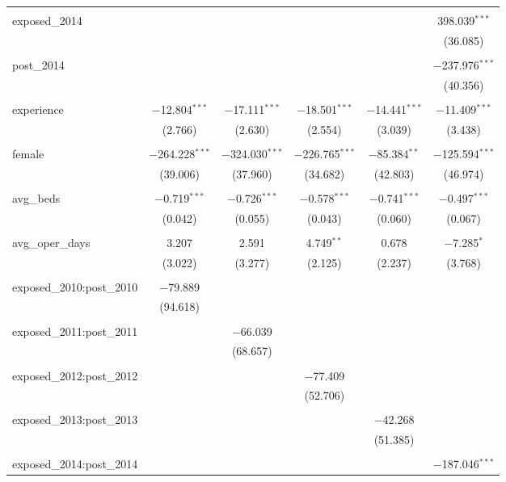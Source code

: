\begin{table}[!htbp]
\begin{tabular}{@{\extracolsep{5pt}}lccccc}
  & & & & & \\ 
 exposed\_2014 &  &  &  &  & 398.039$^{***}$ \\ 
  &  &  &  &  & (36.085) \\ 
  & & & & & \\ 
 post\_2014 &  &  &  &  & $-$237.976$^{***}$ \\ 
  &  &  &  &  & (40.356) \\ 
  & & & & & \\ 
 experience & $-$12.804$^{***}$ & $-$17.111$^{***}$ & $-$18.501$^{***}$ & $-$14.441$^{***}$ & $-$11.409$^{***}$ \\ 
  & (2.766) & (2.630) & (2.554) & (3.039) & (3.438) \\ 
  & & & & & \\ 
 female & $-$264.228$^{***}$ & $-$324.030$^{***}$ & $-$226.765$^{***}$ & $-$85.384$^{**}$ & $-$125.594$^{***}$ \\ 
  & (39.006) & (37.960) & (34.682) & (42.803) & (46.974) \\ 
  & & & & & \\ 
 avg\_beds & $-$0.719$^{***}$ & $-$0.726$^{***}$ & $-$0.578$^{***}$ & $-$0.741$^{***}$ & $-$0.497$^{***}$ \\ 
  & (0.042) & (0.055) & (0.043) & (0.060) & (0.067) \\ 
  & & & & & \\ 
 avg\_oper\_days & 3.207 & 2.591 & 4.749$^{**}$ & 0.678 & $-$7.285$^{*}$ \\ 
  & (3.022) & (3.277) & (2.125) & (2.237) & (3.768) \\ 
  & & & & & \\ 
 exposed\_2010:post\_2010 & $-$79.889 &  &  &  &  \\ 
  & (94.618) &  &  &  &  \\ 
  & & & & & \\ 
 exposed\_2011:post\_2011 &  & $-$66.039 &  &  &  \\ 
  &  & (68.657) &  &  &  \\ 
  & & & & & \\ 
 exposed\_2012:post\_2012 &  &  & $-$77.409 &  &  \\ 
  &  &  & (52.706) &  &  \\ 
  & & & & & \\ 
 exposed\_2013:post\_2013 &  &  &  & $-$42.268 &  \\ 
  &  &  &  & (51.385) &  \\ 
  & & & & & \\ 
 exposed\_2014:post\_2014 &  &  &  &  & $-$187.046$^{***}$ \\ 

\end{tabular}
\end{table}
